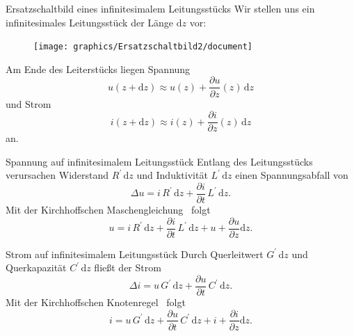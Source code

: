 \documentclass{beamer}
\begin{document}
\begin{frame}{Ersatzschaltbild eines infinitesimalem Leitungsstücks}
Wir stellen uns ein infinitesimales Leitungsstück der Länge $\mathrm{d}z$ vor:
\begin{figure}[!htb]
    \begin{center}
        \texttt{[image: graphics/Ersatzschaltbild2/document]}
    \end{center}
\end{figure}
Am Ende des Leiterstücks liegen Spannung
\[
u(z + \mathrm{d}z) \approx u(z) + \frac{\partial u}{\partial z}(z) \, \mathrm{d}z
\] und Strom
\[
i(z + \mathrm{d}z) \approx i(z) + \frac{\partial i}{\partial z}(z) \, \mathrm{d}z
\] an.
\end{frame}


\begin{frame}{Spannung auf infinitesimalem Leitungsstück}
Entlang des Leitungsstücks verursachen Widerstand $R^{\prime} \, \mathrm{d}z$ und Induktivität
$L^{\prime} \, \mathrm{d}z$ einen Spannungsabfall von
\[
\Delta u = i \, R^{\prime} \, \mathrm{d}z + \frac{\partial i}{\partial t} \, L^{\prime} \, \mathrm{d}z.
\]
Mit der Kirchhoffschen Maschengleichung~\cite{Kirchhoff} folgt
\begin{equation*}
    u = i \, R^{\prime} \, \mathrm{d}z + \frac{\partial i}{\partial t} \, L^{\prime} \, \mathrm{d}z +
    u + \frac{\partial u}{\partial z} \mathrm{d}{z}.
\end{equation*}

\end{frame}


\begin{frame}{Strom auf infinitesimalem Leitungsstück}
Durch Querleitwert $G^{\prime} \, \mathrm{d}z$ und Querkapazität $C^{\prime} \, \mathrm{d}z$ fließt der Strom
\[
\Delta i = u \, G^{\prime} \, \mathrm{d}z + \frac{\partial u}{\partial t} \, C^{\prime} \, \mathrm{d}z.
\]
Mit der Kirchhoffschen Knotenregel~\cite{Kirchhoff} folgt
\begin{equation*}
    i = u \, G^{\prime} \, \mathrm{d}z + \frac{\partial u}{\partial t} \, C^{\prime} \, \mathrm{d}z + i +
    \frac{\partial i}{\partial z} \mathrm{d}z.
\end{equation*}

\end{frame}
\end{document}
